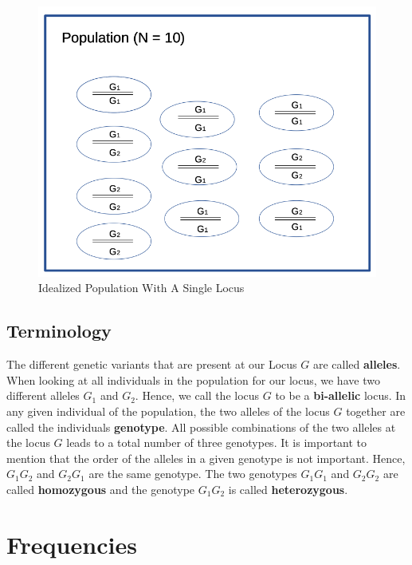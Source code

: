\documentclass[]{book}
\theoremstyle{definition}
\theoremstyle{definition}
\theoremstyle{definition}
\theoremstyle{remark}
\begin{document}
\begin{figure}
\centering
\includegraphics{odg/idealpopsingletrait.png}
\caption{\label{fig:idealpopsingletrait}Idealized Population With A Single Locus}
\end{figure}

\hypertarget{qg-terminology}{%
\subsection{Terminology}\label{qg-terminology}}

The different genetic variants that are present at our Locus \(G\) are called \textbf{alleles}. When looking at all individuals in the population for our locus, we have two different alleles \(G_1\) and \(G_2\). Hence, we call the locus \(G\) to be a \textbf{bi-allelic} locus. In any given individual of the population, the two alleles of the locus \(G\) together are called the individuals \textbf{genotype}. All possible combinations of the two alleles at the locus \(G\) leads to a total number of three genotypes. It is important to mention that the order of the alleles in a given genotype is not important. Hence, \(G_1G_2\) and \(G_2G_1\) are the same genotype. The two genotypes \(G_1G_1\) and \(G_2G_2\) are called \textbf{homozygous} and the genotype \(G_1G_2\) is called \textbf{heterozygous}.

\hypertarget{qg-frequency}{%
\section{Frequencies}\label{qg-frequency}}
\end{document}
